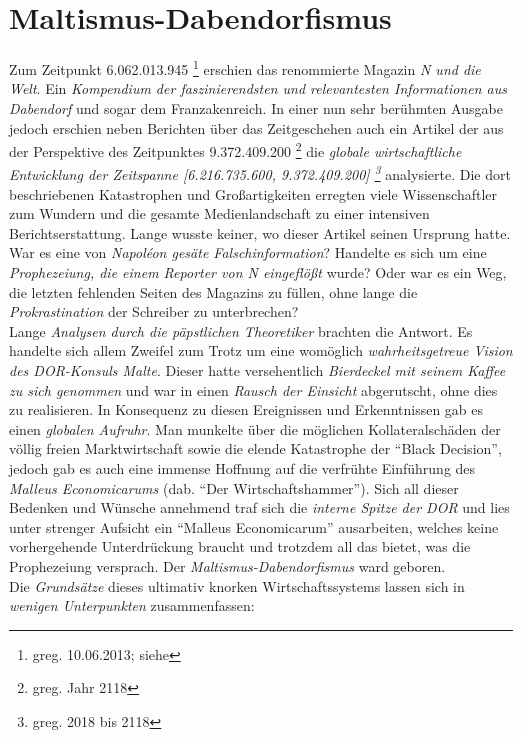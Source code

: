 \section{{Maltismus-Dabendorfismus}}
Zum Zeitpunkt 6.062.013.945 \footnote{greg. 10.06.2013; siehe } erschien das renommierte Magazin \textit{N und die Welt}. Ein \textit{Kompendium der faszinierendsten und relevantesten Informationen aus Dabendorf} und sogar dem Franzakenreich. In einer nun sehr berühmten Ausgabe jedoch erschien neben Berichten über das Zeitgeschehen auch ein Artikel der aus der Perspektive des Zeitpunktes 9.372.409.200 \footnote{greg. Jahr 2118} die \textit{globale wirtschaftliche Entwicklung der Zeitspanne [6.216.735.600, 9.372.409.200] \footnote{greg. 2018 bis 2118}} analysierte. Die dort beschriebenen Katastrophen und Großartigkeiten erregten viele Wissenschaftler zum Wundern und die gesamte Medienlandschaft zu einer intensiven Berichtserstattung. Lange wusste keiner, wo dieser Artikel seinen Ursprung hatte. War es eine von \textit{Napoléon gesäte Falschinformation}? Handelte es sich um eine \textit{Prophezeiung, die einem Reporter von N eingeflößt} wurde? Oder war es ein Weg, die letzten fehlenden Seiten des Magazins zu füllen, ohne lange die \textit{Prokrastination} der Schreiber zu unterbrechen?\\
Lange \textit{Analysen durch die päpstlichen Theoretiker} brachten die Antwort. Es handelte sich allem Zweifel zum Trotz um eine womöglich \textit{wahrheitsgetreue Vision des DOR-Konsuls Malte}. Dieser hatte versehentlich \textit{Bierdeckel mit seinem Kaffee zu sich genommen} und war in einen \textit{Rausch der Einsicht} abgerutscht, ohne dies zu realisieren. In Konsequenz zu diesen Ereignissen und Erkenntnissen gab es einen \textit{globalen Aufruhr}. Man munkelte über die möglichen Kollateralschäden der völlig freien Marktwirtschaft sowie die elende Katastrophe der \enquote{Black Decision}, jedoch gab es auch eine immense Hoffnung auf die verfrühte Einführung des \textit{Malleus Economicarums} ({dab. \enquote{Der Wirtschaftshammer}}). Sich all dieser Bedenken und Wünsche annehmend traf sich die \textit{interne Spitze der DOR} und lies unter strenger Aufsicht ein \enquote{Malleus Economicarum} ausarbeiten, welches keine vorhergehende Unterdrückung braucht und trotzdem all das bietet, was die Prophezeiung versprach. Der \textit{Maltismus-Dabendorfismus} ward geboren.\\[0.5cm]
Die \textit{Grundsätze} dieses ultimativ knorken Wirtschaftssystems lassen sich in \textit{wenigen Unterpunkten} zusammenfassen:
